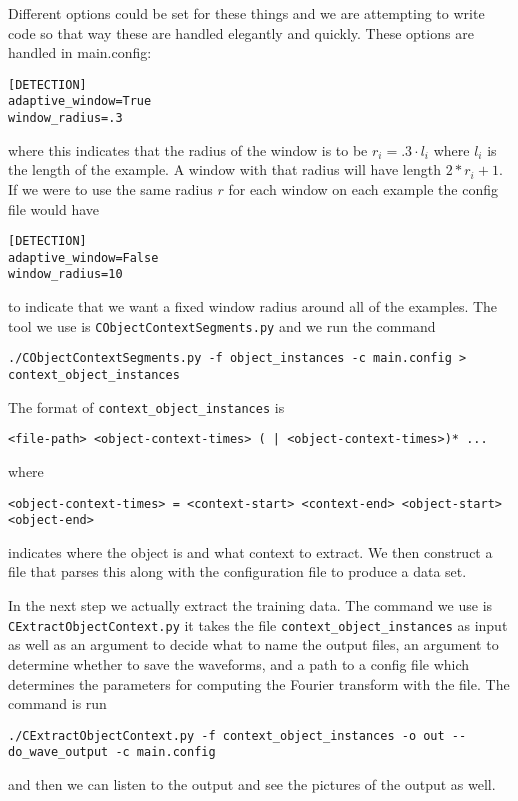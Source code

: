 \documentclass{article}
\begin{document}
Different options could be set for these things and we are
attempting to write code so that way these are handled elegantly
and quickly.  These options are handled in main.config:
\begin{verbatim}
[DETECTION]
adaptive_window=True
window_radius=.3
\end{verbatim}
where this indicates that the radius of the window is to be $r_i=.3\cdot l_i$
where $l_i$ is the length of the example.  A window with that radius will have
length $2*r_i+1$.
If we were to use the same radius $r$ for each window on each example the config
file would have
\begin{verbatim}
[DETECTION]
adaptive_window=False
window_radius=10
\end{verbatim}
to indicate that we want a fixed window radius around all of the
examples.  The tool we use is \texttt{CObjectContextSegments.py}
and we run the command 
\begin{verbatim}
./CObjectContextSegments.py -f object_instances -c main.config > context_object_instances
\end{verbatim}

The format of \texttt{context\_object\_instances} is
\begin{verbatim}
<file-path> <object-context-times> ( | <object-context-times>)* ...
\end{verbatim}
where
\begin{verbatim}
<object-context-times> = <context-start> <context-end> <object-start> <object-end>
\end{verbatim}
indicates where the object is and what context to extract. We then
construct a file that parses this along with the configuration
file to produce a data set.

In the next step we actually extract the training data. The command
we use is \texttt{CExtractObjectContext.py} it takes the file
\texttt{context\_object\_instances} as input as well as
an argument to decide what to name the output files, an argument
to determine whether to save the waveforms, and a path to a config
file which determines the parameters for computing the Fourier
transform with the file.  The command is run
\begin{verbatim}
./CExtractObjectContext.py -f context_object_instances -o out --do_wave_output -c main.config
\end{verbatim}
and then we can listen to the output and see the pictures of
the output as well.
\begin{verbatim}

\end{verbatim}
\end{document}
